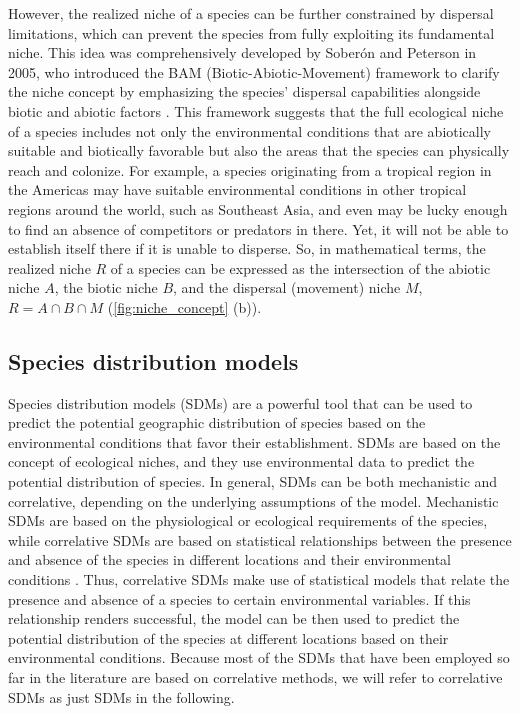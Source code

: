 However, the realized niche of a species can be further constrained by
dispersal limitations, which can prevent the species from fully exploiting
its fundamental niche. This idea was comprehensively developed by Soberón and
Peterson in 2005, who introduced the BAM (Biotic-Abiotic-Movement) framework
to clarify the niche concept by emphasizing the species' dispersal capabilities
alongside biotic and abiotic factors \cite{Soberon2005}. This framework
suggests that the full ecological niche of a species includes not only the
environmental conditions that are abiotically suitable and biotically
favorable but also the areas that the species can physically reach and
colonize. For example, a species originating from a tropical region in the
Americas may have suitable environmental conditions in other tropical regions
around the world, such as Southeast Asia, and even may be lucky enough to find
an absence of competitors or predators in there. Yet, it will not be able to
establish itself there if it is unable to disperse. So, in mathematical terms,
the realized niche $R$ of a species can be expressed as the intersection of the
abiotic niche $A$, the biotic niche $B$, and the dispersal (movement) niche
$M$, $R=A\cap B\cap M$ (\cref{fig:niche_concept} (b)).

\subsection{\label{sec:Species distribution models} Species distribution
  models}

Species distribution models (SDMs) are a powerful tool that can be used to
predict the potential geographic distribution of species based on the
environmental conditions that favor their establishment. SDMs are based on
the concept of ecological niches, and they use environmental data to predict
the potential distribution of species. In general, SDMs can be both
mechanistic and correlative, depending on the underlying assumptions of the
model. Mechanistic SDMs are based on the physiological or ecological
requirements of the species, while correlative SDMs are based on statistical
relationships between the presence and absence of the species in different
locations and their environmental conditions \cite{Kearney2009}. Thus,
correlative SDMs make use of statistical models that relate the presence and
absence of a species to certain environmental variables. If this relationship
renders successful, the model can be then used to predict the potential
distribution of the species at different locations based on their environmental
conditions. Because most of the SDMs that have been employed so far in the
literature are based on correlative methods, we will refer to correlative SDMs
as just SDMs in the following.

